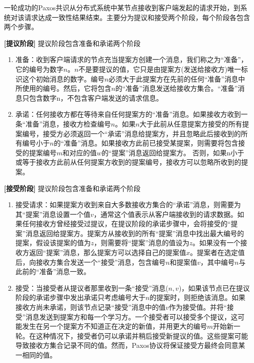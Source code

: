 一轮成功的Paxos共识从分布式系统中某节点接收到客户端发起的请求开始，到系统对该请求达成一致性结果结束。主要分为提议和接受两个阶段，每个阶段各包含两个步骤。

\begin{description}
  \item \textbf{[提议阶段]} 提议阶段包含准备和承诺两个阶段
  \begin{enumerate}
    \item 准备：收到客户端请求的节点充当提案方创建一个消息，我们称之为“准备”，它的编号为数字$n$。$n$不是要提议的值，它只是由提案方(发送给接收方)唯一标识这个初始消息的数字。编号$n$必须大于此提案方在先前的任何“准备”消息中所使用的编号。然后，它将包含$n$的“准备”消息发送给接收方集合。“准备”消息只包含数字n，不包含客户端发送的请求信息。
    \item 承诺：任何接收方都在等待来自任何提案方的“准备”消息。如果接收方收到一条“准备”消息，接收方检查编号$n$。如果$n$大于此前从任意提案方接受的所有提案编号，接受方必须返回一个“承诺”消息给提案方，并且忽略此后接收到的所有编号小于$n$的“准备”消息。如果接收方此前已接受某提案，则需要将包含接受的提案编号$m$和对应的值$w$的“提案”消息返回给提案方。
否则，如果n小于或等于接收方此前从任何提案方收到的提案编号，接收方可以忽略所收到的提案。
  \end{enumerate}

  \item \textbf{[接受阶段]} 提议阶段包含准备和承诺两个阶段
  \begin{enumerate}
    \item 接受请求：如果提案方收到来自大多数接收方集合的“承诺”消息，则需要为其“提案”消息设置一个值$v$，通常这个值表示从客户端接收到的请求数据。如果任何接收方曾经接受过提议，在提议阶段的承诺步骤中，会将接受的“提案”消息返回给提案方。提案方从接收到的所有“提案”消息中找出最大编号的提案，假设该提案的值为$z$，则需要将“提案”消息的值设为$z$。如果没有一个接收方返回“提案”消息，那么提案方可以选择自己的提案值$x$。提案者在选定值后，向接收方集合发送一个“接受”消息，包含编号$n$和提案值$v$，其中编号$n$与此前的“准备”消息一致。
    \item 接受：当接受者从提议者那里收到一条“接受”消息($n,v$)，如果该节点已在提议阶段的承诺步骤中发出承诺只考虑编号大于$n$的提案时，则拒绝该消息。如果接收方尚未承诺，则该节点记录“接受”消息中的值$v$作为接受值。并将“接受”消息发送到提案方和每一个学习方。一个接受者可以接受多个提议，这可能发生在另一个提案方不知道正在决定的新值，并用更大的编号$m$开始新一轮。在这种情况下，接受者仍可以承诺并稍后接受新提议的值。这些提案可能导致接收方集合记录不同的值。然而，Paxos协议将保证接受方最终会同意某一相同的值。
  \end{enumerate}
\end{description}

